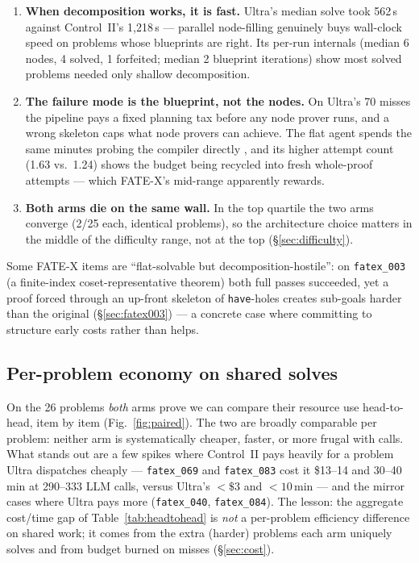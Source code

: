 \documentclass[12pt, a4paper]{article}
\newcommand{\run}[1]{\texttt{#1}}
\begin{document}
\begin{enumerate}[itemsep=2pt]
\item \textbf{When decomposition works, it is fast.} Ultra's median solve took
      562\,s against Control~II's 1{,}218\,s --- parallel node-filling
      genuinely buys wall-clock speed on problems whose blueprints are right.
      Its per-run internals (median 6 nodes, 4 solved, 1 forfeited;
      median 2 blueprint iterations) show most solved problems needed only
      shallow decomposition.
\item \textbf{The failure mode is the blueprint, not the nodes.} On Ultra's
      70 misses the pipeline pays a fixed planning tax before any node prover
      runs, and a wrong skeleton caps what node provers can achieve. The flat
      agent spends the same minutes probing the compiler directly
      \cite{yao2023react}, and its higher attempt count (1.63 vs.\ 1.24)
      shows the budget being recycled into fresh whole-proof attempts ---
      which FATE-X's mid-range apparently rewards.
\item \textbf{Both arms die on the same wall.} In the top quartile the two
      arms converge (2/25 each, identical problems), so the architecture
      choice matters in the middle of the difficulty range, not at the top
      (\S\ref{sec:difficulty}).
\end{enumerate}

Some FATE-X items are ``flat-solvable but decomposition-hostile'': on
\run{fatex\_003} (a finite-index coset-representative theorem) both full passes
succeeded, yet a proof forced through an up-front skeleton of \texttt{have}-holes
creates sub-goals harder than the original (\S\ref{sec:fatex003}) --- a concrete
case where committing to structure early costs rather than helps.

\subsection{Per-problem economy on shared solves}

On the 26 problems \emph{both} arms prove we can compare their resource use
head-to-head, item by item (Fig.~\ref{fig:paired}). The two are broadly
comparable per problem: neither arm is systematically cheaper, faster, or more
frugal with calls. What stands out are a few spikes where Control~II pays
heavily for a problem Ultra dispatches cheaply --- \run{fatex\_069} and
\run{fatex\_083} cost it \$13--14 and 30--40\,min at 290--333 LLM calls, versus
Ultra's ${<}\$3$ and ${<}10$\,min --- and the mirror cases where Ultra pays more
(\run{fatex\_040}, \run{fatex\_084}). The lesson: the aggregate cost/time gap of
Table~\ref{tab:headtohead} is \emph{not} a per-problem efficiency difference on
shared work; it comes from the extra (harder) problems each arm uniquely solves
and from budget burned on misses (\S\ref{sec:cost}).
\end{document}

